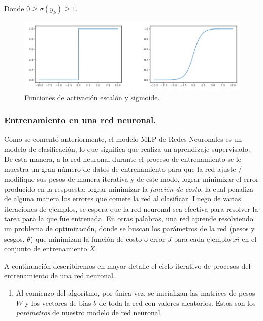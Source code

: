 \documentclass[12pt,a4paper]{article}
\begin{document}
\begin{sloppypar}
Donde $0 \geq \sigma(y_k) \geq 1$.    

\begin{figure}[H]    %
 \centering
 \includegraphics[width=1\textwidth]{images/ANN/5-ANN.png}
 \caption{Funciones de activación escalón y sigmoide\cite{ANN_25}.} 
 \label{fig:ann_5}
\end{figure}

\subsubsection{Entrenamiento en una red neuronal.}\label{entren_ann}

Como se comentó anteriormente, el modelo MLP de Redes Neuronales es un modelo de clasificación, lo que significa que realiza un aprendizaje supervisado. De esta manera, a la red neuronal durante el proceso de entrenamiento se le muestra un gran número de datos de entrenamiento para que la red ajuste / modifique sus pesos de manera iterativa y de este modo, lograr minimizar el error producido en la respuesta: lograr minimizar la \textit{función de costo}, la cual penaliza de alguna manera los errores que comete la red al clasificar. Luego de varias iteraciones de ejemplos, se espera que la red neuronal sea efectiva para resolver la tarea para la que fue entrenada.
En otras palabras, una red aprende resolviendo un problema de optimización, donde se buscan los parámetros de la red (pesos y sesgos, $\theta$) que minimizan la función de costo o error $J$ para cada ejemplo $xi$ en el conjunto de entrenamiento $X$. 

A continuación describiremos en mayor detalle el ciclo iterativo de procesos del entrenamiento de una red neuronal\cite{ANN_25}.

\begin{enumerate}
\item Al comienzo del algoritmo, por única vez, se inicializan las matrices de pesos $W$ y los vectores de bias $b$ de toda la red con valores aleatorios. Estos son los \textit{parámetros} de nuestro modelo de red neuronal.
  

\end{enumerate}
\end{sloppypar}
\end{document}
